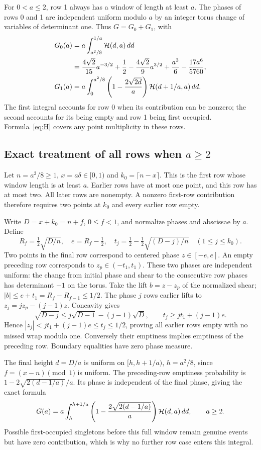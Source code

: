\documentclass[11pt,a4paper]{article}
\theoremstyle{remark}\newtheorem{remark}{Remark}
\numberwithin{equation}{section}
\begin{document}
For $0<a\le2$, row 1 always has a window of length at least $a$. The phases of rows 0 and 1 are independent uniform modulo $a$ by an integer torus change of variables of determinant one. Thus $G=G_0+G_1$, with
\begin{align}\label{eq:Gsmall}
 G_0(a)&=a\int_{a^2/8}^{1/a}\mathcal H(d,a)\,dd\nonumber\\
 &=\frac{4\sqrt2}{15}a^{-3/2}+\frac12-\frac{4\sqrt2}{9}a^{3/2}
   +\frac{a^3}{6}-\frac{17a^6}{5760},\\
 G_1(a)&=a\int_0^{a^2/8}\left(1-\frac{2\sqrt{2d}}a\right)\mathcal H(d+1/a,a)\,dd.\nonumber
\end{align}
The first integral accounts for row 0 when its contribution can be nonzero; the second accounts for its being empty and row 1 being first occupied. Formula~\eqref{eq:H} covers any point multiplicity in these rows.

\subsection{Exact treatment of all rows when \texorpdfstring{$a\ge2$}{a >= 2}}
Let $n=a^3/8\ge1$, $x=a\delta\in[0,1)$ and $k_0=\lceil n-x\rceil$. This is the first row whose window length is at least $a$. Earlier rows have at most one point, and this row has at most two. All later rows are nonempty. A nonzero first-row contribution therefore requires two points at $k_0$ and every earlier row empty.

Write $D=x+k_0=n+f$, $0\le f<1$, and normalize phases and abscissae by $a$. Define
\[
 R_f=\tfrac12\sqrt{D/n},\quad e=R_f-\tfrac12,\quad
 t_j=\tfrac12-\tfrac12\sqrt{(D-j)/n}\quad(1\le j\le k_0).
\]
Two points in the final row correspond to centered phase $z\in[-e,e]$. An empty preceding row corresponds to $z_p\in(-t_1,t_1)$. These two phases are independent uniform: the change from initial phase and shear to the consecutive row phases has determinant $-1$ on the torus. Take the lift $b=z-z_p$ of the normalized shear; $|b|\le e+t_1=R_f-R_{f-1}\le1/2$. The phase $j$ rows earlier lifts to $z_j=jz_p-(j-1)z$. Concavity gives
\[
 \sqrt{D-j}\le j\sqrt{D-1}-(j-1)\sqrt D,
 \qquad t_j\ge jt_1+(j-1)e.
\]
Hence $|z_j|<jt_1+(j-1)e\le t_j\le1/2$, proving all earlier rows empty with no missed wrap modulo one. Conversely their emptiness implies emptiness of the preceding row. Boundary equalities have zero phase measure.

The final height $d=D/a$ is uniform on $[h,h+1/a)$, $h=a^2/8$, since $f=(x-n)\pmod1$ is uniform. The preceding-row emptiness probability is $1-2\sqrt{2(d-1/a)}/a$. Its phase is independent of the final phase, giving the exact formula
\begin{equation}\label{eq:Gtail}
 G(a)=a\int_h^{h+1/a}
       \left(1-\frac{2\sqrt{2(d-1/a)}}a\right)\mathcal H(d,a)\,dd,
 \qquad a\ge2.
\end{equation}
Possible first-occupied singletons before this full window remain genuine events but have zero contribution, which is why no further row case enters this integral.
\end{document}
